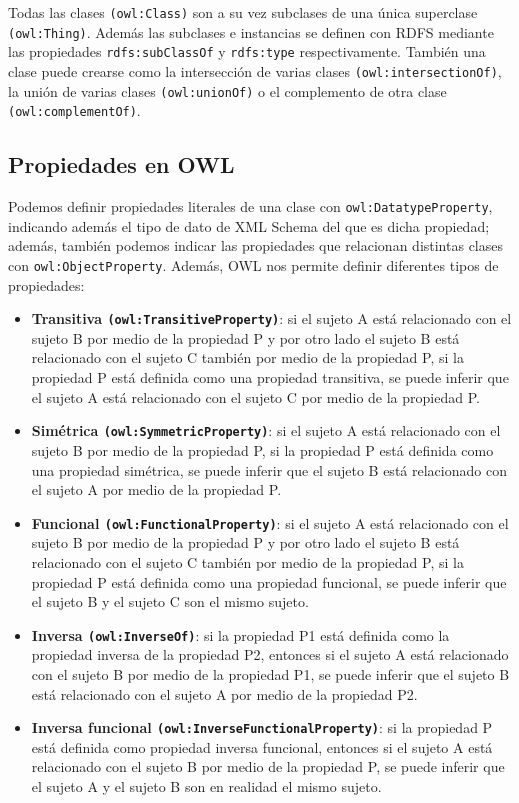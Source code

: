 \bigskip

Todas las clases {\tt (owl:Class)} son a su vez subclases de una única superclase {\tt (owl:Thing)}. Además las subclases e instancias se definen con {\sf RDFS} mediante las propiedades {\tt rdfs:subClassOf} y {\tt rdfs:type} respectivamente. También una clase puede crearse como la intersección de varias clases {\tt (owl:intersectionOf)}, la unión de varias clases {\tt (owl:unionOf)} o el complemento de otra clase {\tt (owl:complementOf)}.

\subsection{Propiedades en OWL}	

Podemos definir propiedades literales de una clase con {\tt owl:DatatypeProperty}, indicando además el tipo de dato de {\sf XML Schema} del que es dicha propiedad; además, también podemos indicar las propiedades que relacionan distintas clases con {\tt owl:ObjectProperty}. Además, {\sf OWL}  nos permite definir diferentes tipos de propiedades:

	\begin{itemize}
		\item \textbf{Transitiva {\tt (owl:TransitiveProperty)}}: si el sujeto A está relacionado con el sujeto B por medio de la propiedad P y por otro lado el sujeto B está relacionado con el sujeto C también por medio de la propiedad P, si la propiedad P está definida como una propiedad transitiva, se puede inferir que el sujeto A está relacionado con el sujeto C por medio de la propiedad P.
		\item \textbf{Simétrica {\tt (owl:SymmetricProperty)}}: si el sujeto A está relacionado con el sujeto B por medio de la propiedad P, si la propiedad P está definida como una propiedad simétrica, se puede inferir que el sujeto B está relacionado con el sujeto A por medio de la propiedad P.
		\item \textbf{Funcional {\tt (owl:FunctionalProperty)}}: si el sujeto A está relacionado con el sujeto B por medio de la propiedad P y por otro lado el sujeto B está relacionado con el sujeto C también por medio de la propiedad P, si la propiedad P está definida como una propiedad funcional, se puede inferir que el sujeto B y el sujeto C son el mismo sujeto.
		\item \textbf{Inversa {\tt (owl:InverseOf)}}: si la propiedad P1 está definida como la propiedad inversa de la propiedad P2, entonces si el sujeto A está relacionado con el sujeto B por medio de la propiedad P1, se puede inferir que el sujeto B está relacionado con el sujeto A por medio de la propiedad P2.
		\item \textbf{Inversa funcional {\tt (owl:InverseFunctionalProperty)}}: si la propiedad P está definida como propiedad inversa funcional, entonces si el sujeto A está relacionado con el sujeto B por medio de la propiedad P, se puede inferir que el sujeto A y el sujeto B son en realidad el mismo sujeto.
	\end{itemize}

